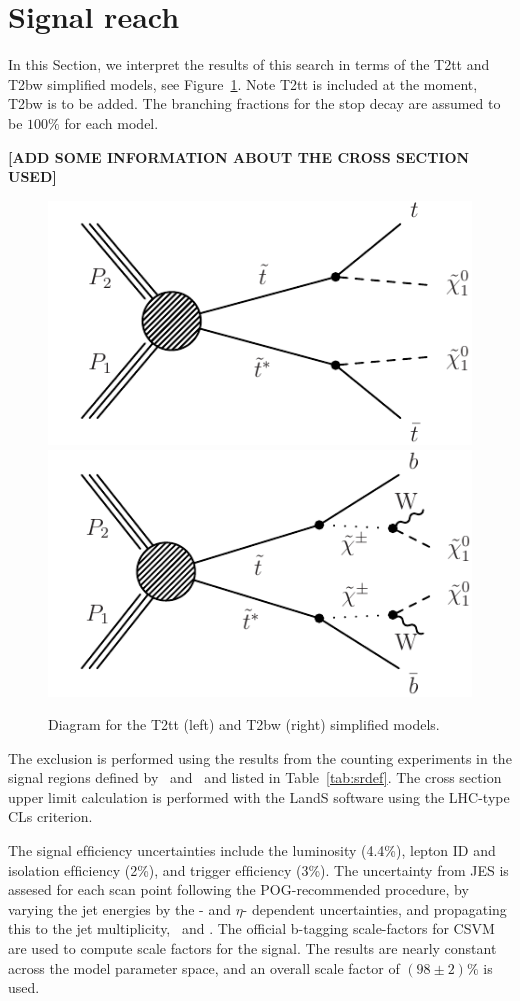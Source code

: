 \section{Signal reach}
\label{sec:signal}

In this Section, we interpret the results of this search in terms of
the T2tt and T2bw simplified models, see Figure~\ref{fig:SigDiagram}.
Note T2tt is included at the moment, T2bw is to be added.
The branching fractions for the stop decay are assumed to be $100\%$
for each model. 

{\bf[ADD SOME INFORMATION ABOUT THE CROSS SECTION USED]}

\begin{figure}[hbt]
  \begin{center}
        \includegraphics[width=0.5\linewidth]{plots/stopPlot/T2tt.pdf}%
        \includegraphics[width=0.5\linewidth]{plots/stopPlot/T2bw.pdf}%
	\caption{Diagram for the T2tt (left) and T2bw (right)
          simplified models.}
	\label{fig:SigDiagram}
      \end{center}
\end{figure}

The exclusion is performed using the results from the counting experiments in the signal regions
defined by \met\ and \mt\ and listed in Table~\ref{tab:srdef}. 
The cross section upper limit calculation is performed with the LandS software using the LHC-type CLs criterion. 

The signal efﬁciency uncertainties include the luminosity (4.4\%), lepton ID and isolation
efﬁciency (2\%), and trigger efﬁciency (3\%). The uncertainty from JES
is assesed for each scan point following the POG-recommended
procedure, by varying the jet energies by the \pt- and $\eta$-
dependent uncertainties, and propagating this to the jet multiplicity,
\met\ and \mt. The official b-tagging scale-factors for CSVM are used to compute scale
factors for the signal. The results are nearly constant across the
model parameter space, and an overall scale factor of $(98 \pm 2)\%$
is used. 

